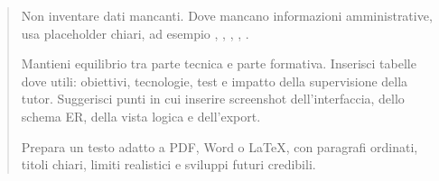\begin{quote}
Non inventare dati mancanti. Dove mancano informazioni amministrative, usa placeholder chiari, ad esempio , , , , .

Mantieni equilibrio tra parte tecnica e parte formativa. Inserisci tabelle dove utili: obiettivi, tecnologie, test e impatto della supervisione della tutor. Suggerisci punti in cui inserire screenshot dell'interfaccia, dello schema ER, della vista logica e dell'export.

Prepara un testo adatto a PDF, Word o LaTeX, con paragrafi ordinati, titoli chiari, limiti realistici e sviluppi futuri credibili.
\end{quote}

